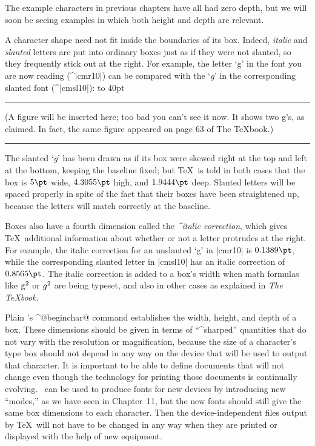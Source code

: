 {{{{\medskip\noindent
The example characters in previous chapters have all had zero depth, but
we will soon be seeing examples in which both height and depth are relevant.

A character shape need not fit inside the boundaries of its box. Indeed,
{\it italic\/} and {\sl slanted\/} letters are put into ordinary boxes
just as if they were not slanted, so they frequently stick out at the right.
For example, the letter `g\/' in the font you are now reading (^|cmr10|)
can be compared with the `{\sl g\/}' in the corresponding slanted
font (^|cmsl10|):
\begindisplay
\vbox to 40pt{\ifproofmode\hrule\vfill
  \hsize=2.5in \baselineskip 6pt \fiverm\noindent
  (A figure will be inserted here; too bad you can't see it now.
  It shows two g's, as claimed. In fact, the same figure appeared
  on page 63 of The TeXbook.)
  \vfill\hrule\fi}
\enddisplay
The slanted `{\sl g\/}' has been drawn as if its box were skewed right at the
top and left at the bottom, keeping the baseline fixed; but \TeX\ is told
in both cases that the box is $5\pt$ wide, $4.3055\pt$ high, and $1.9444\pt$
deep. Slanted letters will be spaced properly in spite of the fact that their
boxes have been straightened up, because the letters will match correctly
at the baseline.

\danger Boxes also have a fourth dimension called the {\sl^{italic
correction}}, which gives \TeX\ additional information about whether or
not a letter protrudes at the right. For example, the italic correction
for an unslanted `g\/' in |cmr10| is $0.1389\pt$, while the corresponding
slanted letter in |cmsl10| has an italic correction of $0.8565\pt$. The
italic correction is added to a box's width when math formulas like ${\rm
g}^2$ or ${\sl g}^2$ are being typeset, and also in other cases as
explained in {\sl The \TeX book}.

Plain \MF's ^@beginchar@ command establishes the width, height, and depth
of a box. These dimensions should be given in terms of ``^{sharped}''
quantities that do not vary with the resolution or magnification, because
the size of a character's type box should not depend in any way on the device
that will be used to output that character. It is important to be able to
define documents that will not change even though the technology for printing
those documents is continually evolving. \MF\ can be used to produce fonts for
new devices by introducing new ``modes,'' as we have seen in Chapter~11,
but the new fonts should still give the same box dimensions to each character.
Then the device-independent files output by \TeX\ will not have to be
changed in any way when they are printed or displayed with the help of
new equipment.

}}}}
